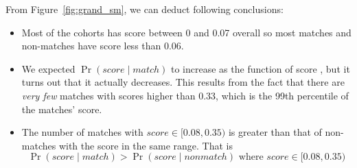 From Figure~\ref{fig:grand_sm}, we can deduct following conclusions:
\begin{itemize}
\item Most of the cohorts has score between 0 and 0.07 overall so most matches
and non-matches have score less than 0.06.
\item We expected $\Pr{(score \mid match)}$ to increase as the function of score
, but it turns out that it actually decreases. This results from the fact that
there are \emph{very few} matches with scores higher than 0.33, which is the 99th
percentile of the matches' score.

\item The number of matches with $score \in [0.08, 0.35)$ is greater than that
of non-matches with the score in the same range. That is $$\Pr{(score \mid
match)} > \Pr{(score \mid nonmatch)} \mbox{ where } score\in [0.08, 0.35)$$

\end{itemize}


